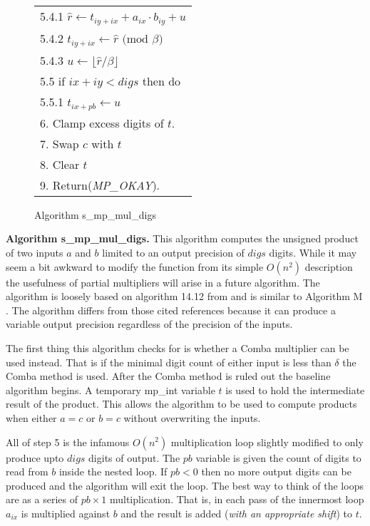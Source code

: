 \documentclass[b5paper]{book}
\begin{document}
\begin{figure}[!here]
\begin{small}
\begin{center}
\begin{tabular}{l}
\hspace{6mm}5.4.1  $\hat r \leftarrow t_{iy + ix} + a_{ix} \cdot b_{iy} + u$ \\
\hspace{6mm}5.4.2  $t_{iy + ix} \leftarrow \hat r \mbox{ (mod }\beta\mbox{)}$ \\
\hspace{6mm}5.4.3  $u \leftarrow \lfloor \hat r / \beta \rfloor$ \\
\hspace{3mm}5.5  if $ix + iy < digs$ then do \\
\hspace{6mm}5.5.1  $t_{ix + pb} \leftarrow u$ \\
6.  Clamp excess digits of $t$. \\
7.  Swap $c$ with $t$ \\
8.  Clear $t$ \\
9.  Return(\textit{MP\_OKAY}). \\
\hline
\end{tabular}
\end{center}
\end{small}
\caption{Algorithm s\_mp\_mul\_digs}
\end{figure}



\textbf{Algorithm s\_mp\_mul\_digs.}
This algorithm computes the unsigned product of two inputs $a$ and $b$ limited to an output precision of $digs$ digits.  While it may seem
a bit awkward to modify the function from its simple $O(n^2)$ description the usefulness of partial multipliers will arise in a future 
algorithm.  The algorithm is loosely based on algorithm 14.12 from \cite[pp. 595]{HAC} and is similar to Algorithm M \cite[pp. 268]{TAOCPV2}.  The
algorithm differs from those cited references because it can produce a variable output precision regardless of the precision of the inputs.

The first thing this algorithm checks for is whether a Comba multiplier can be used instead.   That is if the minimal digit count of either
input is less than $\delta$ the Comba method is used.    After the Comba method is ruled out the baseline algorithm begins.  A 
temporary mp\_int variable $t$ is used to hold the intermediate result of the product.  This allows the algorithm to be used to 
compute products when either $a = c$ or $b = c$ without overwriting the inputs.  

All of step 5 is the infamous $O(n^2)$ multiplication loop slightly modified to only produce upto $digs$ digits of output.  The $pb$ variable
is given the count of digits to read from $b$ inside the nested loop.  If $pb < 0$ then no more output digits can be produced and the algorithm
will exit the loop.  The best way to think of the loops are as a series of $pb \times 1$ multiplication.    That is, in each pass of the 
innermost loop $a_{ix}$ is multiplied against $b$ and the result is added (\textit{with an appropriate shift}) to $t$.  
\end{document}

